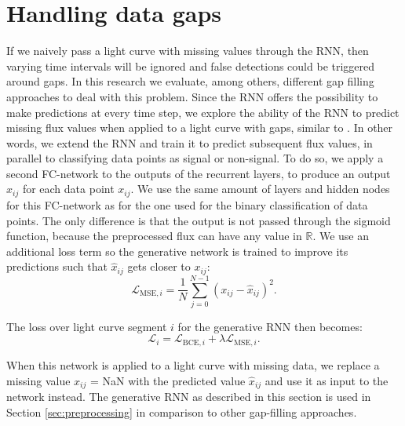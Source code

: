 
\section{Handling data gaps}
\label{sec:rnn_gen}

If we naively pass a light curve with missing values through the RNN, then varying time intervals will be ignored and false detections could be triggered around gaps. In this research we evaluate, among others, different gap filling approaches to deal with this problem. Since the RNN offers the possibility to make predictions at every time step, we explore the ability of the RNN to predict missing flux values when applied to a light curve with gaps, similar to \cite{morvan2020detrending}. In other words, we extend the RNN and train it to predict subsequent flux values, in parallel to classifying data points as signal or non-signal. To do so, we apply a second FC-network to the outputs of the recurrent layers, to produce an output $\hat{x}_{ij}$ for each data point $x_{ij}$. We use the same amount of layers and hidden nodes for this FC-network as for the one used for the binary classification of data points. The only difference is that the output is not passed through the sigmoid function, because the preprocessed flux can have any value in $\mathbb{R}$. We use an additional loss term so the generative network is trained to improve its predictions such that $\hat{x}_{ij}$ gets closer to $x_{ij}$:
\begin{equation}
    \mathcal{L}_{\text{MSE},i} = \frac{1}{N}\sum^{N-1}_{j=0} (x_{ij} - \hat{x}_{ij})^2.
\end{equation}

\noindent The loss over light curve segment $i$ for the generative RNN then becomes:
\begin{equation}
    \mathcal{L}_i = \mathcal{L}_{\text{BCE},i} + \lambda \mathcal{L}_{\text{MSE},i}.
\end{equation}

\noindent When this network is applied to a light curve with missing data, we replace a missing value $x_{ij}$ = NaN with the predicted value $\hat{x}_{ij}$ and use it as input to the network instead. The generative RNN as described in this section is used in Section \ref{sec:preprocessing} in comparison to other gap-filling approaches.
